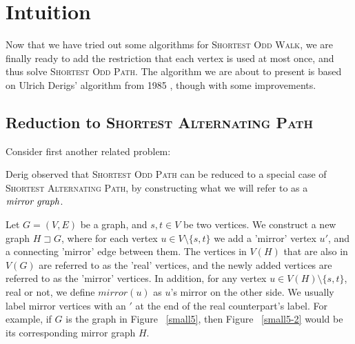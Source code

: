 \section{Intuition}
Now that we have tried out some algorithms for \textsc{Shortest Odd Walk}, we are finally ready to add the restriction that each vertex is used at most once, and thus solve \textsc{Shortest Odd Path}. The algorithm we are about to present is based on Ulrich Derigs' algorithm from 1985 \cite{derigs_shortest_odd_path}, though with some improvements.

\subsection{Reduction to \textsc{Shortest Alternating Path}}
Consider first another related problem:


Derig observed that \textsc{Shortest Odd Path} can be reduced to a special case of \textsc{Shortest Alternating Path}, by constructing what we will refer to as a $\emph{mirror graph}$.

\begin{definition}
    Let $G = (V, E)$ be a graph, and $s,t \in V$ be two vertices.
    We construct a new graph $H \sqsupset G$, where for each vertex $u \in V \setminus \{s,t\}$ we add a 'mirror' vertex $u'$, and a connecting 'mirror' edge between them. 
    The vertices in $V(H)$ that are also in $V(G)$ are referred to as the 'real' vertices, and the newly added vertices are referred to as the 'mirror' vertices. In addition, for any vertex $u \in V(H) \setminus \{s,t\}$, real or not, we define $mirror(u)$ as $u$'s mirror on the other side. We usually label mirror vertices with an $'$ at the end of the real counterpart's label.
    For example, if $G$ is the graph in Figure ~\ref{small5}, then Figure ~\ref{small5-2} would be its corresponding mirror graph $H$.
\end{definition}

